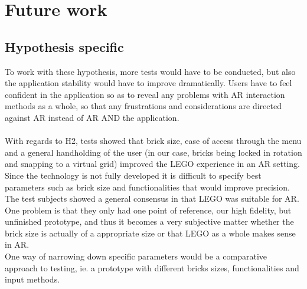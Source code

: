 
\section{Future work}

\subsection{Hypothesis specific}
To work with these hypothesis, more tests would have to be conducted, but also the application stability would have to improve dramatically. Users have to feel confident in the application so as to reveal any problems with AR interaction methods as a whole, so that any frustrations and considerations are directed against AR instead of AR AND the application.\\
\\
With regards to H2, tests showed that brick size, ease of access through the menu and a general handholding of the user (in our case, bricks being locked in rotation and snapping to a virtual grid) improved the LEGO experience in an AR setting. Since the technology is not fully developed it is difficult to specify best parameters such as brick size and functionalities that would improve precision. The test subjects showed a general consensus in that LEGO was suitable for AR. One problem is that they only had one point of reference, our high fidelity, but unfinished prototype, and thus it becomes a very subjective matter whether the brick size is actually of a appropriate size or that LEGO as a whole makes sense in AR.\\
One way of narrowing down specific parameters would be a comparative approach to testing, ie. a prototype with different bricks sizes, functionalities and input methods. 

